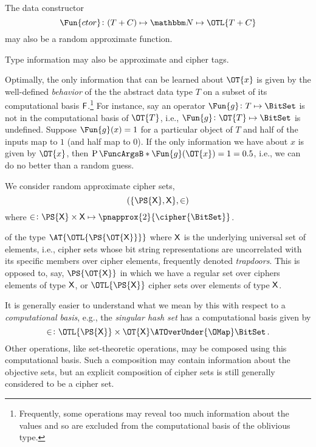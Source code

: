 \documentclass[ ../main.tex]{subfiles}
\begin{document}
The data constructor
\begin{equation}
    \Fun{ctor} \colon (T + C) \mapsto \NatSet \mapsto \OTL{T+C}
\end{equation}
may also be a random approximate function.

Type information may also be approximate and cipher tags.




Optimally, the only information that can be learned about $\OT{x}$ is given by the well-defined \emph{behavior} of the the abstract data type $T$ on a subset of its computational basis $\Set{F}$.\footnote{
Frequently, some operations may reveal too much information about the values and so are excluded from the computational basis of the oblivious type.}
For instance, say an operator $\Fun{g} \colon T \mapsto \BitSet$ is not in the computational basis of $\OT{T}$, i.e., $\Fun{g} \colon \OT{T} \mapsto \BitSet$ is undefined.
Suppose $\Fun{g}(x) = 1$ for a particular object of $T$ and half of the inputs map to $1$ (and half map to $0$).
If the only information we have about $x$ is given by $\OT{x}$, then $\Prob{\Fun{g}(\OT{x})=1} = 0.5$, i.e., we can do no better than a random guess.

We consider random approximate cipher sets,
\begin{equation}
    (\{\PS{\Set{X}},\Set{X}\},\SetContains)
\end{equation}
where $\SetContains \colon \PS{\Set{X}} \times \Set{X} \mapsto \pnapprox{2}{\cipher{\BitSet}}$.

 of the type $\AT{\OTL{\PS{\OT{\Set{X}}}}}$ where $\Set{X}$ is the underlying universal set of elements, i.e., cipher sets whose bit string representations are uncorrelated with its specific members over cipher elements, frequently denoted \emph{trapdoors}.
This is opposed to, say, $\PS{\OT{\Set{X}}}$ in which we have a regular set over ciphers elements of type $\Set{X}$, or $\OTL{\PS{\Set{X}}}$ cipher sets over elements of type $\Set{X}$.

It is generally easier to understand what we mean by this with respect to a \emph{computational basis}, e.g., the 
\emph{singular hash set} has a computational basis given by
\begin{equation}
	\SetContains \colon \OTL{\PS{\Set{X}}} \times \OT{\Set{X}} \ATOverUnder{\OMap} \BitSet\,.
\end{equation}
Other operations, like set-theoretic operations, may be composed using this computational basis.
Such a composition may contain information about the objective sets, but an explicit composition of cipher sets is still generally considered to be a cipher set.
\end{document}
